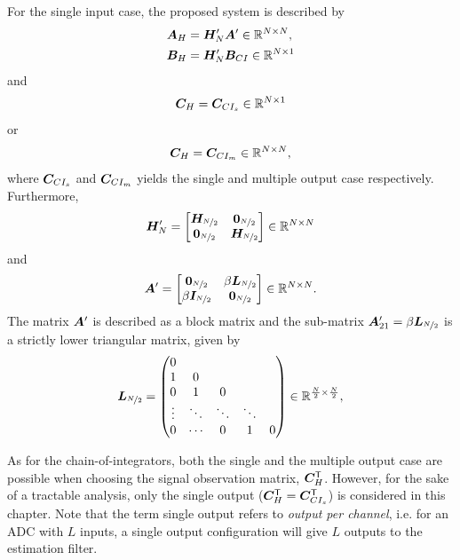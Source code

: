 For the single input case, the proposed system is described by
\begin{align}
    \bm{A}_H & = \bm{H}'_N \bm{A}' \label{eq:AH_def} \in \mathbb{R}^{N \times N}, \\
    \bm{B}_H & = \bm{H}'_N \bm{B}_{CI} \label{eq:BH_def} \in \mathbb{R}^{N \times 1}
\end{align}
and
\begin{equation}
    \label{eq:CHs_def}
    \bm{C}_H = \bm{C}_{CI_s} \in \mathbb{R}^{N \times 1}
\end{equation}
or
\begin{equation}
    \label{eq:CHm_def}
    \bm{C}_H = \bm{C}_{CI_m} \in \mathbb{R}^{N \times N},
\end{equation}
where $\bm{C}_{CI_s}$ and $\bm{C}_{CI_m}$ yields the single and multiple output case respectively.
Furthermore,
\begin{equation}
    \label{eq:defn_}
    \bm{H}'_N =
    \begin{bmatrix}
        \bm{H_}{\nicefrac{N}{2}} & \bm{0}_{\nicefrac{N}{2}} \\
        \bm{0}_{\nicefrac{N}{2}} & \bm{H_}{\nicefrac{N}{2}}
    \end{bmatrix} \in \mathbb{R}^{N \times N}
\end{equation}
and
\begin{equation}
    \label{eq:def_AH_}
    \bm{A}' =
    \begin{bmatrix}
        \bm{0}_{\nicefrac{N}{2}} & \beta \bm{L}_{\nicefrac{N}{2}} \\
        \beta \bm{I}_{\nicefrac{N}{2}} & \bm{0}_{\nicefrac{N}{2}}
    \end{bmatrix} \in \mathbb{R}^{N \times N}.
\end{equation}
The matrix $\bm{A}'$ is described as a block matrix and the sub-matrix $\bm{A}'_{21} = \beta \bm{L}_{\nicefrac{N}{2}}$ is a strictly lower triangular matrix, given by
\begin{equation}
    \label{eq:def_Lmat}
    \bm{L}_{\nicefrac{N}{2}} =
    \begin{pmatrix}
        0 \\
        1 & 0 & \\
        0 & 1 & 0 \\
        \vdots & \ddots & \ddots & \ddots \\
        0 & \cdots & 0 & 1 & 0
    \end{pmatrix}
    \in \mathbb{R}^{\frac{N}{2} \times \frac{N}{2}},
\end{equation}

As for the chain-of-integrators, both the single and the multiple output case are possible when choosing the signal observation matrix, $\bm{C}^\mathsf{T}_H$. However, for the sake of a tractable analysis, only the single output ($\bm{C}^\mathsf{T}_H = \bm{C}^\mathsf{T}_{CI_s}$) is considered in this chapter. Note that the term single output refers to \textit{output per channel}, i.e. for an ADC with $L$ inputs, a single output configuration will give $L$ outputs to the estimation filter.

